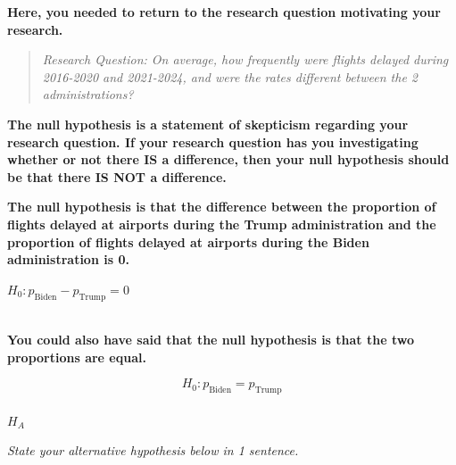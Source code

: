 \documentclass[
  letterpaper,
  DIV=11,
  numbers=noendperiod]{scrartcl}
\makeatletter
\let\oldparagraph\paragraph
\renewcommand{\paragraph}{
    \@ifstar
      \xxxParagraphStar
      \xxxParagraphNoStar
  }
\newcommand{\xxxParagraphStar}[1]{\oldparagraph*{#1}\mbox{}}
\newcommand{\xxxParagraphNoStar}[1]{\oldparagraph{#1}\mbox{}}
\makeatother
\begin{document}
\begin{tcolorbox}[enhanced jigsaw, colback=white, breakable, arc=.35mm, left=2mm, colframe=quarto-callout-warning-color-frame, opacityback=0, rightrule=.15mm, toprule=.15mm, bottomrule=.15mm, leftrule=.75mm]

\textbf{Here, you needed to return to the research question motivating
your research.}

\begin{quote}
\emph{Research Question: On average, how frequently were flights delayed
during 2016-2020 and 2021-2024, and were the rates different between the
2 administrations?}
\end{quote}

\textbf{The null hypothesis is a statement of skepticism regarding your
research question. If your research question has you investigating
whether or not there IS a difference, then your null hypothesis should
be that there IS NOT a difference.}

\textbf{The null hypothesis is that the difference between the
proportion of flights delayed at airports during the Trump
administration and the proportion of flights delayed at airports during
the Biden administration is 0.}

\(H_0 \colon p_{\text{Biden}}-p_{\text{Trump}}=0\)\\
\strut \\
\textbf{You could also have said that the null hypothesis is that the
two proportions are equal.}

\[
H_0 \colon p_{\text{Biden}}=p_{\text{Trump}}
\]

\end{tcolorbox}

\paragraph{\texorpdfstring{\(H_A\)}{H\_A}}\label{h_a}

\emph{State your alternative hypothesis below in 1 sentence.}
\end{document}
